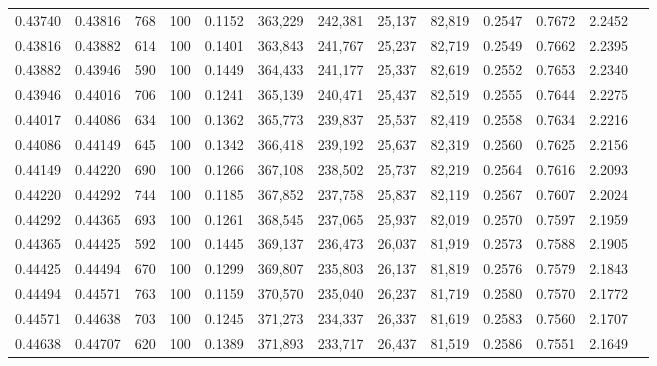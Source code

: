\begin{tabular}{rrrrrrrrrrrrr}
0.43740 & 0.43816 &   768 & 100 &                                     0.1152 & 363,229 & 242,381 &  25,137 &  82,819 & 0.2547 & 0.7672 & 2.2452 \\
0.43816 & 0.43882 &   614 & 100 &                                     0.1401 & 363,843 & 241,767 &  25,237 &  82,719 & 0.2549 & 0.7662 & 2.2395 \\
0.43882 & 0.43946 &   590 & 100 &                                     0.1449 & 364,433 & 241,177 &  25,337 &  82,619 & 0.2552 & 0.7653 & 2.2340 \\
0.43946 & 0.44016 &   706 & 100 &                                     0.1241 & 365,139 & 240,471 &  25,437 &  82,519 & 0.2555 & 0.7644 & 2.2275 \\
0.44017 & 0.44086 &   634 & 100 &                                     0.1362 & 365,773 & 239,837 &  25,537 &  82,419 & 0.2558 & 0.7634 & 2.2216 \\
0.44086 & 0.44149 &   645 & 100 &                                     0.1342 & 366,418 & 239,192 &  25,637 &  82,319 & 0.2560 & 0.7625 & 2.2156 \\
0.44149 & 0.44220 &   690 & 100 &                                     0.1266 & 367,108 & 238,502 &  25,737 &  82,219 & 0.2564 & 0.7616 & 2.2093 \\
0.44220 & 0.44292 &   744 & 100 &                                     0.1185 & 367,852 & 237,758 &  25,837 &  82,119 & 0.2567 & 0.7607 & 2.2024 \\
0.44292 & 0.44365 &   693 & 100 &                                     0.1261 & 368,545 & 237,065 &  25,937 &  82,019 & 0.2570 & 0.7597 & 2.1959 \\
0.44365 & 0.44425 &   592 & 100 &                                     0.1445 & 369,137 & 236,473 &  26,037 &  81,919 & 0.2573 & 0.7588 & 2.1905 \\
0.44425 & 0.44494 &   670 & 100 &                                     0.1299 & 369,807 & 235,803 &  26,137 &  81,819 & 0.2576 & 0.7579 & 2.1843 \\
0.44494 & 0.44571 &   763 & 100 &                                     0.1159 & 370,570 & 235,040 &  26,237 &  81,719 & 0.2580 & 0.7570 & 2.1772 \\
0.44571 & 0.44638 &   703 & 100 &                                     0.1245 & 371,273 & 234,337 &  26,337 &  81,619 & 0.2583 & 0.7560 & 2.1707 \\
0.44638 & 0.44707 &   620 & 100 &                                     0.1389 & 371,893 & 233,717 &  26,437 &  81,519 & 0.2586 & 0.7551 & 2.1649 \\

\end{tabular}
